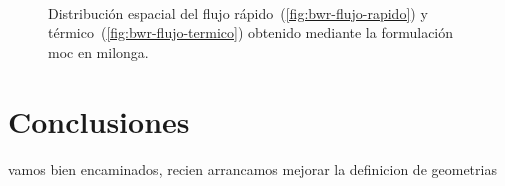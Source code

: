 \documentclass[11pt]{article}
\numberwithin{equation}{section}
\begin{document}
\begin{figure}[!ht]
 \begin{center}
  \\
  \caption{Distribución espacial del flujo rápido~(\ref{fig:bwr-flujo-rapido}) y térmico~(\ref{fig:bwr-flujo-termico}) obtenido mediante la formulación moc en milonga.}
  \label{fig:bwr-flujos}
 \end{center}
\end{figure}


\section{Conclusiones}

vamos bien encaminados, recien arrancamos
mejorar la definicion de geometrias




\pagebreak
\printbibliography
\label{lastpage}
\end{document}
